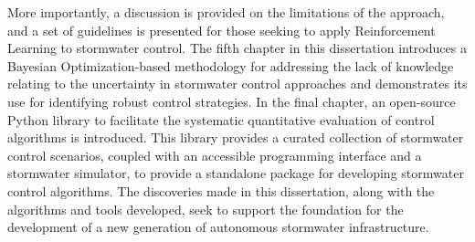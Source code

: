 More importantly, a discussion is provided on the limitations of the approach, and a set of guidelines is presented for those seeking to apply Reinforcement Learning to stormwater control.
The fifth chapter in this dissertation introduces a Bayesian Optimization-based methodology for addressing the lack of knowledge relating to the uncertainty in stormwater control approaches and demonstrates its use for identifying robust control strategies.
In the final chapter, an open-source Python library to facilitate the systematic quantitative evaluation of control algorithms is introduced.
This library provides a curated collection of stormwater control scenarios, coupled with an accessible programming interface and a stormwater simulator, to provide a standalone package for developing stormwater control algorithms.
The discoveries made in this dissertation, along with the algorithms and tools developed, seek to support the foundation for the development of a new generation of autonomous stormwater infrastructure.
\endgroup

\vfill


